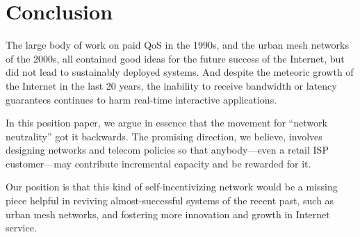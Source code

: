 \section{Conclusion}
The large body of work on paid QoS in the 1990s, and the urban mesh
networks of the 2000s, all contained good ideas for the future success
of the Internet, but did not lead to sustainably deployed systems. And
despite the meteoric growth of the Internet in the last 20 years, the
inability to receive bandwidth or latency guarantees continues to harm
real-time interactive applications.

In this position paper, we argue in essence that the movement for
``network neutrality'' got it backwards. The promising direction, we
believe, involves designing networks and telecom policies so that
anybody---even a retail ISP customer---may contribute incremental
capacity and be rewarded for it.

Our position is that this kind of self-incentivizing network would be a
missing piece helpful in reviving almost-successful systems of the
recent past, such as urban mesh networks, and fostering more innovation
and growth in Internet service.

\label{sec:conc}
